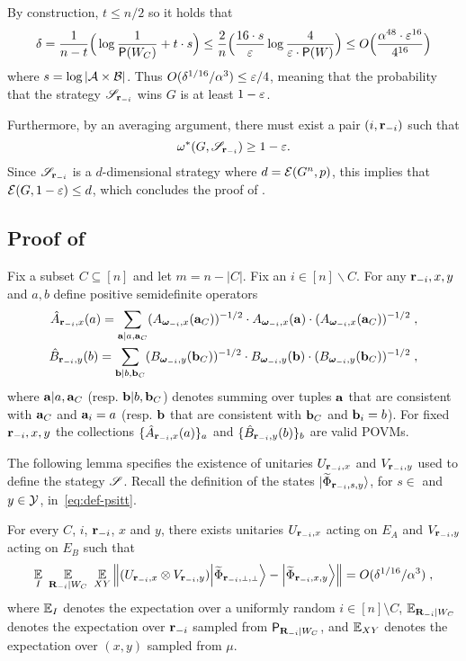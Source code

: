 By construction, $t \leq n/2$ so it holds that
\[
\delta = \frac{1}{n-t} \Big( \log \frac{1}{\mathsf{P}(W_C)} + t \cdot s \Big) \leq \frac{2}{n} \Big ( \frac{16 \cdot s}{\varepsilon} \log \frac{4}{\varepsilon \cdot \mathsf{P}(W)} \Big) \leq O \Big( \frac{\alpha^{48} \cdot \varepsilon^{16}}{4^{16}} \Big)
\]
where $s = \log |\mathcal{A} \times \mathcal{B}|$. Thus $O(\delta^{1/16}/\alpha^3) \leq \varepsilon/4$, meaning that the probability that the strategy $\mathscr{S}_{\mathbf{r}_{-i}}$ wins $G$ is at least $1 - \varepsilon$.

Furthermore, by an averaging argument, there must exist a pair $(i,\mathbf{r}_{-i})$ such that
\[
	\omega^*(G,\mathscr{S}_{\mathbf{r}_{-i}}) \geq 1 - \varepsilon.
\]
Since $\mathscr{S}_{\mathbf{r}_{-i}}$ is a $d$-dimensional strategy where $d = \mathcal{E}(G^n,p)$, this implies that $\mathcal{E}(G,1 - \varepsilon) \leq d$, which concludes the proof of .

\subsection{Proof of }
\label{sec:main-lemma-proof}

Fix a subset $C \subseteq [n]$ and let $m=n-|C|$. Fix an $i\in [n]\backslash C$. For any $\mathbf{r}_{-i},x,y$ and $a,b$ define positive semidefinite operators
\begin{align*}
	\hat{A}_{\mathbf{r}_{-i},x}(a) = \sum_{\mathbf{a} | a, \mathbf{a}_C} (A_{{\boldsymbol{\omega}}_{-i},x}(\mathbf{a}_C) )^{-1/2} \cdot A_{{\boldsymbol{\omega}}_{-i},x}(\mathbf{a}) \cdot (A_{{\boldsymbol{\omega}}_{-i},x}(\mathbf{a}_C) )^{-1/2} \;,\\
	\hat{B}_{\mathbf{r}_{-i}, y}(b) = \sum_{\mathbf{b} | b, \mathbf{b}_C}  (B_{{\boldsymbol{\omega}}_{-i},y}(\mathbf{b}_C) )^{-1/2} \cdot B_{{\boldsymbol{\omega}}_{-i},y}(\mathbf{b}) \cdot (B_{{\boldsymbol{\omega}}_{-i},y}(\mathbf{b}_C) )^{-1/2}\;,
\end{align*}
where $\mathbf{a} | a, \mathbf{a}_C$ (resp. $\mathbf{b} | b, \mathbf{b}_C$) denotes summing over tuples $\mathbf{a}$ that are consistent with $\mathbf{a}_C$ and $\mathbf{a}_i = a$ (resp. $\mathbf{b}$ that are consistent with $\mathbf{b}_C$ and $\mathbf{b}_i = b$). For fixed $\mathbf{r}_{-i}, x,y$ the collections $\{\hat{A}_{\mathbf{r}_{-i}, x}(a) \}_{a}$ and $\{\hat{B}_{\mathbf{r}_{-i},y}(b)\}_{b}$ are valid POVMs. 

The following lemma specifies the existence of unitaries $U_{\mathbf{r}_{-i},x}$ and $V_{\mathbf{r}_{-i},y}$ used to define the stategy $\mathscr{S}$. Recall the definition of the states ${|\widetilde{\Phi}_{\mathbf{r}_{-i},s,y}\rangle}$, for $s\in $ and $y\in \mathcal{Y}$, in~\eqref{eq:def-psitt}.
	

\begin{lemma}
\label{lem:local_unitaries}
	For every $C$, $i$, $\mathbf{r}_{-i}$, $x$ and $y$, there exists unitaries $U_{\mathbf{r}_{-i},x}$ acting on $E_A$ and $V_{\mathbf{r}_{-i},y}$ acting on $E_B$ such that
	$$
		\Ex_I \,\, \Ex_{\bR_\mi | W_C} \,\, \Ex_{XY}  \Big \| (U_{\br_\mi,x} \otimes V_{\br_\mi,y}) \bigket{\wt{\Phi}_{\sspp}} - \bigket{\wt{\Phi}_{\ssxy}} \Big\| = O(\delta^{1/16}/\alpha^3)\;,
	$$
	where $\operatorname*{\mathbb{E}}_I$ denotes the expectation over a uniformly random $i \in [n] \setminus C$, $\operatorname*{\mathbb{E}}_{\mathbf{R}_{-i} | W_C}$ denotes the expectation over $\mathbf{r}_{-i}$ sampled from $\mathsf{P}_{\mathbf{R}_{-i} | W_C}$, and $\operatorname*{\mathbb{E}}_{XY}$ denotes the expectation over $(x,y)$ sampled from $\mu$. 
\end{lemma}

